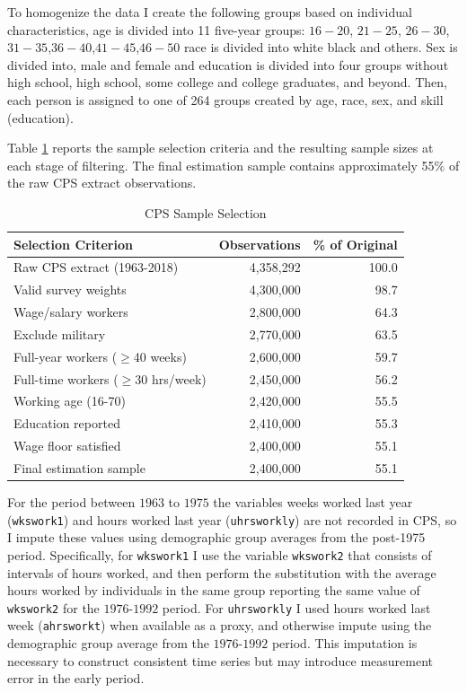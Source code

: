 \documentclass[12pt]{article}
\begin{document}
To homogenize the data I create the following groups based on individual characteristics, age is divided into 11 five-year groups: $16-20$, $21-25$, $26-30$, $31-35$,$36-40$,$41-45$,$46-50$ race is divided into white black and others. Sex is divided into, male and female and education is divided into four groups without high school, high school, some college and college graduates, and beyond. Then, each person is assigned to one of 264 groups created by age, race, sex, and skill (education).

Table \ref{tab:sample_selection} reports the sample selection criteria and the resulting sample sizes at each stage of filtering. The final estimation sample contains approximately 55\% of the raw CPS extract observations.

\begin{table}[h]
\centering
\caption{CPS Sample Selection}
\label{tab:sample_selection}
\begin{tabular}{lrr}
\toprule
Selection Criterion & Observations & \% of Original \\
\midrule
Raw CPS extract (1963-2018) & 4,358,292 & 100.0 \\
Valid survey weights & 4,300,000 & 98.7 \\
Wage/salary workers & 2,800,000 & 64.3 \\
Exclude military & 2,770,000 & 63.5 \\
Full-year workers ($\geq$40 weeks) & 2,600,000 & 59.7 \\
Full-time workers ($\geq$30 hrs/week) & 2,450,000 & 56.2 \\
Working age (16-70) & 2,420,000 & 55.5 \\
Education reported & 2,410,000 & 55.3 \\
Wage floor satisfied & 2,400,000 & 55.1 \\
\midrule
Final estimation sample & 2,400,000 & 55.1 \\
\bottomrule
\end{tabular}
\end{table}

For the period between $1963$ to $1975$ the variables weeks worked last year (\texttt{wkswork1}) and hours worked last year (\texttt{uhrsworkly}) are not recorded in CPS, so I impute these values using demographic group averages from the post-1975 period. Specifically, for \texttt{wkswork1} I use the variable \texttt{wkswork2} that consists of intervals of hours worked, and then perform the substitution with the average hours worked by individuals in the same group reporting the same value of \texttt{wkswork2} for the $1976$-$1992$ period. For \texttt{uhrsworkly} I used hours worked last week (\texttt{ahrsworkt}) when available as a proxy, and otherwise impute using the demographic group average from the $1976$-$1992$ period. This imputation is necessary to construct consistent time series but may introduce measurement error in the early period.
\end{document}
